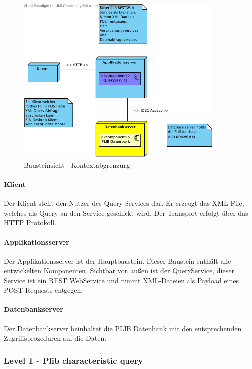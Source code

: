 \begin{figure}[htbp]
	\centering
		\includegraphics[width=0.9\textwidth]{images/bausteinsicht_plib_level0.png}
	\caption{Bausteinsicht - Kontextabgrenzung}
	\label{fig:bausteinsicht_level0}
\end{figure}

\paragraph{Klient}

Der Klient stellt den Nutzer des Query Services dar. Er erzeugt das XML File, welches als Query an den Service geschickt wird. Der Transport erfolgt über das HTTP Protokoll.  

\paragraph{Applikationsserver}

Der Applikationsserver ist der Hauptbaustein. Dieser Baustein enthält alle entwickelten Komponenten. Sichtbar von außen ist der QueryService, dieser Service ist ein REST WebService und nimmt XML-Dateien als Payload eines POST Requests entgegen. 

\paragraph{Datenbankserver}
Der Datenbankserver beinhaltet die PLIB Datenbank mit den entsprechenden Zugriffsprozeduren auf die Daten.

\subsubsection{Level 1 - Plib characteristic query} 


